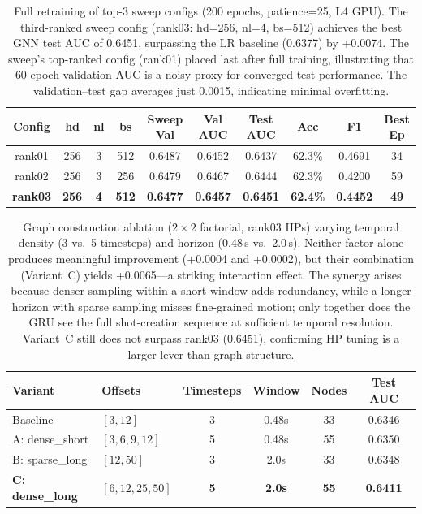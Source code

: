 \documentclass{article}
\begin{document}
\begin{table}[H]
\centering
\caption{Full retraining of top-3 sweep configs (200 epochs, patience=25, L4 GPU). The third-ranked sweep config (rank03: hd=256, nl=4, bs=512) achieves the best GNN test AUC of 0.6451, surpassing the LR baseline (0.6377) by +0.0074. The sweep's top-ranked config (rank01) placed last after full training, illustrating that 60-epoch validation AUC is a noisy proxy for converged test performance. The validation--test gap averages just 0.0015, indicating minimal overfitting.}
\label{tab:rerun_results}
\small
\begin{tabular}{@{}cccccccccc@{}}
\toprule
\textbf{Config} & \textbf{hd} & \textbf{nl} & \textbf{bs} & \textbf{Sweep Val} & \textbf{Val AUC} & \textbf{Test AUC} & \textbf{Acc} & \textbf{F1} & \textbf{Best Ep} \\
\midrule
rank01 & 256 & 3 & 512 & 0.6487 & 0.6452 & 0.6437 & 62.3\% & 0.4691 & 34 \\
rank02 & 256 & 3 & 256 & 0.6479 & 0.6467 & 0.6444 & 62.3\% & 0.4200 & 59 \\
\textbf{rank03} & \textbf{256} & \textbf{4} & \textbf{512} & \textbf{0.6477} & \textbf{0.6457} & \textbf{0.6451} & \textbf{62.4\%} & \textbf{0.4452} & \textbf{49} \\
\bottomrule
\end{tabular}
\end{table}

\begin{table}[H]
\centering
\caption{Graph construction ablation ($2\!\times\!2$ factorial, rank03 HPs) varying temporal density (3 vs.\ 5 timesteps) and horizon (0.48\,s vs.\ 2.0\,s). Neither factor alone produces meaningful improvement (+0.0004 and +0.0002), but their combination (Variant~C) yields +0.0065---a striking interaction effect. The synergy arises because denser sampling within a short window adds redundancy, while a longer horizon with sparse sampling misses fine-grained motion; only together does the GRU see the full shot-creation sequence at sufficient temporal resolution. Variant~C still does not surpass rank03 (0.6451), confirming HP tuning is a larger lever than graph structure.}
\label{tab:graph_variants}
\small
\begin{tabular}{@{}llcccc@{}}
\toprule
\textbf{Variant} & \textbf{Offsets} & \textbf{Timesteps} & \textbf{Window} & \textbf{Nodes} & \textbf{Test AUC} \\
\midrule
Baseline & $[3, 12]$ & 3 & 0.48s & 33 & 0.6346 \\
A: dense\_short & $[3, 6, 9, 12]$ & 5 & 0.48s & 55 & 0.6350 \\
B: sparse\_long & $[12, 50]$ & 3 & 2.0s & 33 & 0.6348 \\
\textbf{C: dense\_long} & $[6, 12, 25, 50]$ & \textbf{5} & \textbf{2.0s} & \textbf{55} & \textbf{0.6411} \\
\bottomrule
\end{tabular}
\end{table}
\end{document}
